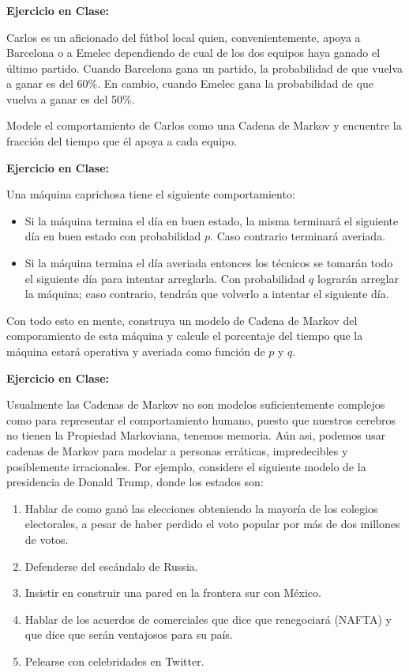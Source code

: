 \documentclass[ 10pt, xcolor = dvipsnames]{beamer}
\begin{document}
\begin{frame}[allowframebreaks]
\frametitle{\insertsubsection}

\textbf{Ejercicio en Clase:}

Carlos es un aficionado del f\'utbol local quien, convenientemente, apoya a Barcelona o a Emelec dependiendo de cual de los dos equipos haya ganado el \'ultimo partido. Cuando Barcelona gana un partido, la probabilidad de que vuelva a ganar es del 60\%. En cambio, cuando Emelec gana la probabilidad de que vuelva a ganar es del 50\%. 

Modele el comportamiento de Carlos como una Cadena de Markov y encuentre la fracci\'on del tiempo que \'el apoya a cada equipo. 

\framebreak

\textbf{Ejercicio en Clase:}

Una m\'aquina caprichosa tiene el siguiente comportamiento: 
\begin{itemize}
\item Si la m\'aquina termina el d\'ia en buen estado, la misma terminar\'a el siguiente d\'ia en buen estado con probabilidad $p$. Caso contrario terminar\'a averiada. 
\item Si la m\'aquina termina el d\'ia averiada entonces los t\'ecnicos se tomar\'an todo el siguiente d\'ia para intentar arreglarla. Con probabilidad $q$ lograr\'an arreglar la m\'aquina; caso contrario, tendr\'an que volverlo a intentar el siguiente d\'ia. 
\end{itemize}

Con todo esto en mente, construya un modelo de Cadena de Markov del comporamiento de esta m\'aquina y calcule el porcentaje del tiempo que la m\'aquina estar\'a operativa y averiada como funci\'on de $p$ y $q$. 

\framebreak

\textbf{Ejercicio en Clase:}

Usualmente las Cadenas de Markov no son modelos suficientemente complejos como para representar el comportamiento humano, puesto que nuestros cerebros no tienen la Propiedad Markoviana, \ie tenemos memoria. A\'un asi, podemos usar cadenas de Markov para modelar a personas err\'aticas, impredecibles y posiblemente irracionales. Por ejemplo, considere el siguiente modelo de la presidencia de Donald Trump, donde los estados son: 
\begin{enumerate}
\item Hablar de como gan\'o las elecciones obteniendo la mayor\'ia de los colegios electorales, a pesar de haber perdido el voto popular por m\'as de dos millones de votos. 
\item Defenderse del esc\'andalo de Russia. 
\item Insistir en construir una pared en la frontera sur con M\'exico. 
\framebreak
\item Hablar de los acuerdos de comerciales que dice que renegociar\'a (\eg NAFTA) y que dice que ser\'an ventajosos para su pa\'is. 
\item Pelearse con celebridades en Twitter. 
\end{enumerate}
\fullskip


\end{frame}
\end{document}
